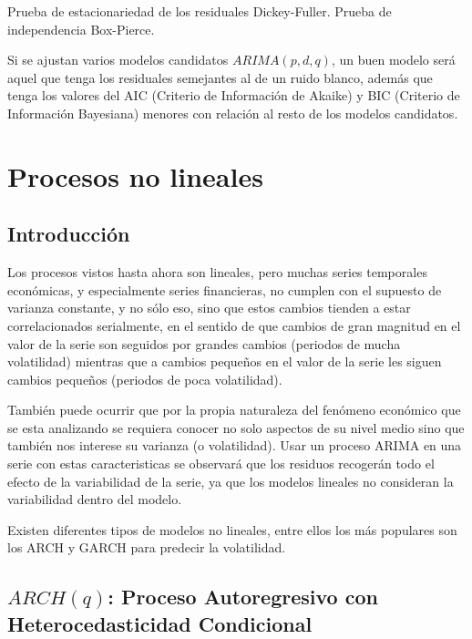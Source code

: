 \documentclass[
  a4paper,
  oneside,
  openany]{book}
\begin{document}
Prueba de estacionariedad de los residuales Dickey-Fuller.
Prueba de independencia Box-Pierce.

Si se ajustan varios modelos candidatos \(ARIMA(p,d,q)\), un buen modelo será aquel que tenga los residuales semejantes al de un ruido blanco, además que tenga los valores del AIC (Criterio de Información de Akaike) y BIC (Criterio de Información Bayesiana) menores con relación al resto de los modelos candidatos.

\hypertarget{part-procesos-no-lineales}{%
\part{Procesos no lineales}\label{part-procesos-no-lineales}}

\hypertarget{introducciuxf3n-1}{%
\chapter{Introducción}\label{introducciuxf3n-1}}

Los procesos vistos hasta ahora son lineales, pero muchas series temporales económicas, y especialmente series financieras, no cumplen con el supuesto de varianza constante, y no sólo eso, sino que estos cambios tienden a estar correlacionados serialmente, en el sentido de que cambios de gran magnitud en el valor de la serie son seguidos por grandes cambios (periodos de mucha volatilidad) mientras que a cambios pequeños en el valor de la serie les siguen cambios pequeños (periodos de poca volatilidad).

También puede ocurrir que por la propia naturaleza del fenómeno económico que se esta analizando se requiera conocer no solo aspectos de su nivel medio sino que también nos interese su varianza (o volatilidad). Usar un proceso ARIMA en una serie con estas caracteristicas se observará que los residuos recogerán todo el efecto de la variabilidad de la serie, ya que los modelos lineales no consideran la variabilidad dentro del modelo.

Existen diferentes tipos de modelos no lineales, entre ellos los más
populares son los ARCH y GARCH para predecir la volatilidad.

\hypertarget{archq-proceso-autoregresivo-con-heterocedasticidad-condicional}{%
\chapter{\texorpdfstring{\(ARCH(q)\): Proceso Autoregresivo con Heterocedasticidad Condicional}{ARCH(q): Proceso Autoregresivo con Heterocedasticidad Condicional}}\label{archq-proceso-autoregresivo-con-heterocedasticidad-condicional}}
\end{document}
